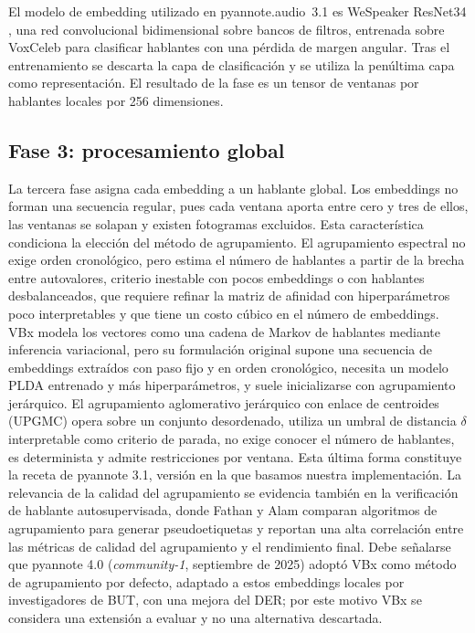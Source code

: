 \documentclass[11pt,a4paper]{article}
\begin{document}
El modelo de embedding utilizado en pyannote.audio~3.1 es WeSpeaker ResNet34 \cite{wang2023}, una red convolucional bidimensional sobre bancos de filtros, entrenada sobre VoxCeleb para clasificar hablantes con una pérdida de margen angular. Tras el entrenamiento se descarta la capa de clasificación y se utiliza la penúltima capa como representación. El resultado de la fase es un tensor de ventanas por hablantes locales por 256 dimensiones.

\subsection{Fase 3: procesamiento global}

La tercera fase asigna cada embedding a un hablante global. Los embeddings no forman una secuencia regular, pues cada ventana aporta entre cero y tres de ellos, las ventanas se solapan y existen fotogramas excluidos. Esta característica condiciona la elección del método de agrupamiento. El agrupamiento espectral no exige orden cronológico, pero estima el número de hablantes a partir de la brecha entre autovalores, criterio inestable con pocos embeddings o con hablantes desbalanceados, que requiere refinar la matriz de afinidad con hiperparámetros poco interpretables y que tiene un costo cúbico en el número de embeddings. VBx \cite{landini2022} modela los vectores como una cadena de Markov de hablantes mediante inferencia variacional, pero su formulación original supone una secuencia de embeddings extraídos con paso fijo y en orden cronológico, necesita un modelo PLDA entrenado y más hiperparámetros, y suele inicializarse con agrupamiento jerárquico. El agrupamiento aglomerativo jerárquico con enlace de centroides (UPGMC) opera sobre un conjunto desordenado, utiliza un umbral de distancia $\delta$ interpretable como criterio de parada, no exige conocer el número de hablantes, es determinista y admite restricciones por ventana. Esta última forma constituye la receta de pyannote 3.1, versión en la que basamos nuestra implementación. La relevancia de la calidad del agrupamiento se evidencia también en la verificación de hablante autosupervisada, donde Fathan y Alam \cite{fathan2024} comparan algoritmos de agrupamiento para generar pseudoetiquetas y reportan una alta correlación entre las métricas de calidad del agrupamiento y el rendimiento final. Debe señalarse que pyannote 4.0 (\emph{community-1}, septiembre de 2025) adoptó VBx como método de agrupamiento por defecto, adaptado a estos embeddings locales por investigadores de BUT, con una mejora del DER; por este motivo VBx se considera una extensión a evaluar y no una alternativa descartada.
\end{document}
